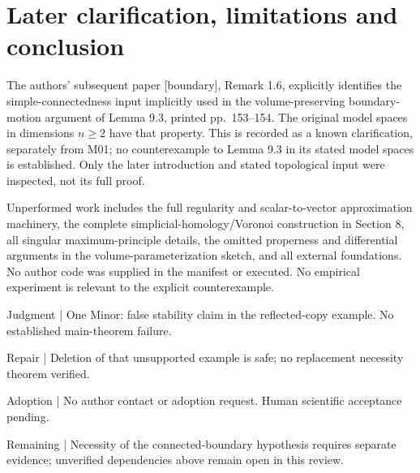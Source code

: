 \documentclass[10pt]{article}
\begin{document}
\section*{Later clarification, limitations and conclusion}
The authors’ subsequent paper [boundary], Remark 1.6, explicitly identifies the simple-connectedness input implicitly used in the volume-preserving boundary-motion argument of Lemma 9.3, printed pp. 153–154. The original model spaces in dimensions \(n\geq2\) have that property. This is recorded as a known clarification, separately from M01; no counterexample to Lemma 9.3 in its stated model spaces is established. Only the later introduction and stated topological input were inspected, not its full proof.\par
Unperformed work includes the full regularity and scalar-to-vector approximation machinery, the complete simplicial-homology/Voronoi construction in Section 8, all singular maximum-principle details, the omitted properness and differential arguments in the volume-parameterization sketch, and all external foundations. No author code was supplied in the manifest or executed. No empirical experiment is relevant to the explicit counterexample.\par
Judgment | One Minor: false stability claim in the reflected-copy example. No established main-theorem failure.\par
Repair | Deletion of that unsupported example is safe; no replacement necessity theorem verified.\par
Adoption | No author contact or adoption request. Human scientific acceptance pending.\par
Remaining | Necessity of the connected-boundary hypothesis requires separate evidence; unverified dependencies above remain open in this review.\par
\end{document}
